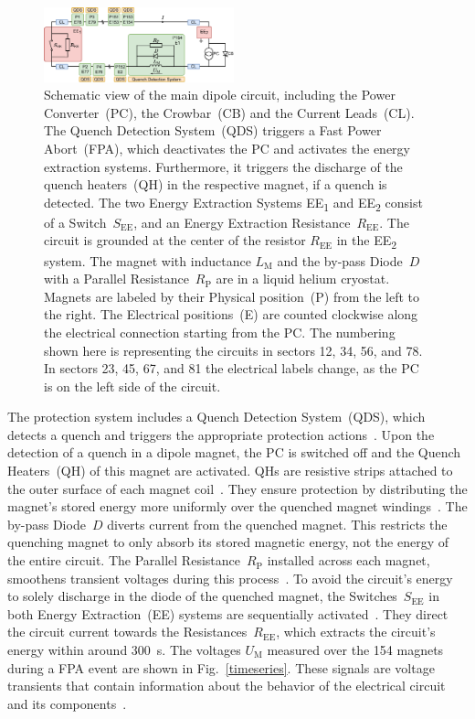 \documentclass[lettersize,journal]{IEEEtran}
\begin{document}
\begin{figure}
    \centering
    \includegraphics[width=0.49\textwidth]{figures/circuit_diagram.drawio.pdf}
    \caption{Schematic view of the main dipole circuit, including the Power Converter~(PC), the Crowbar~(CB) and the Current Leads~(CL). 
    The Quench Detection System~(QDS) triggers a Fast Power Abort~(FPA), which deactivates the PC and activates the energy extraction systems. Furthermore, it triggers the discharge of the quench heaters~(QH) in the respective magnet, if a quench is detected.
    The two Energy Extraction Systems EE\textsubscript{1} and EE\textsubscript{2} consist of a Switch~$S_\text{EE}$, and an Energy Extraction Resistance~$R_\text{EE}$. The circuit is grounded at the center of the resistor $R_\text{EE}$ in the EE\textsubscript{2} system. 
    The magnet with inductance $L_\text{M}$ and the by-pass Diode~$D$ with a Parallel Resistance~$R_\text{P}$ are in a liquid helium cryostat.
    Magnets are labeled by their Physical position~(P) from the left to the right. The Electrical positions~(E) are counted clockwise along the electrical connection starting from the PC. The numbering shown here is representing the circuits in sectors 12, 34, 56, and 78. In sectors 23, 45, 67, and 81 the electrical labels change, as the PC is on the left side of the circuit.
    }
    \label{circuit}
\end{figure}

The protection system includes a Quench Detection System~(QDS), which detects a quench and triggers the appropriate protection actions~\cite{Denz2006,Denz2009}.
Upon the detection of a quench in a dipole magnet, the PC is switched off and the Quench Heaters~(QH) of this magnet are activated.
QHs are resistive strips attached to the outer surface of each magnet coil~\cite{Rodriguez2000}.
They ensure protection by distributing the magnet's stored energy more uniformly over the quenched magnet windings~\cite{Sonnemann2001}. 
The by-pass Diode~$D$ diverts current from the quenched magnet.
This restricts the quenching magnet to only absorb its stored magnetic energy, not the energy of the entire circuit. The Parallel Resistance~$R_\text{P}$ installed across each magnet, smoothens transient voltages during this process~\cite{Bourgeois2001}. 
To avoid the circuit's energy to solely discharge in the diode of the quenched magnet, the Switches~$S_\text{EE}$ in both Energy Extraction~(EE) systems are sequentially activated~\cite{Dahlerup2002}.
They direct the circuit current towards the Resistances~$R_\text{EE}$, which extracts the circuit's energy within around 300~s. 
The voltages $U_\text{M}$ measured over the 154 magnets during a FPA event are shown in Fig.~\ref{timeseries}. 
These signals are voltage transients that contain information about the behavior of the electrical circuit and its components~\cite{2ravaioli2012}.
\end{document}
